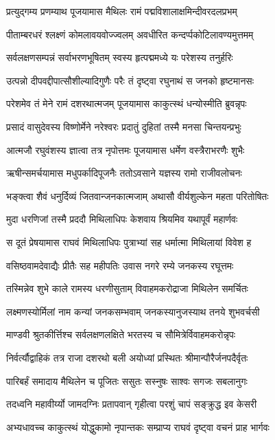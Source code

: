 \twolineshloka
{प्रत्युद्गम्य प्रणम्याथ पूजयामास मैथिलः}
{रामं पद्मविशालाक्षमिन्दीवरदलप्रभम्}%

\twolineshloka
{पीताम्बरधरं श्लक्ष्णं कोमलावयवोज्ज्वलम्}
{अवधीरित कन्दर्प्पकोटिलावण्यमुत्तमम्}%

\twolineshloka
{सर्वलक्षणसम्पन्नं सर्वाभरणभूषितम्}
{स्वस्य हृत्पद्ममध्ये यः परेशस्य तनुर्हरिः}%

\twolineshloka
{उत्पन्नो दीपवद्दीपात्सौशील्यादिगुणैः परैः}
{तं दृष्ट्वा रघुनाथं स जनको हृष्टमानसः}%

\twolineshloka
{परेशमेव तं मेने रामं दशरथात्मजम्}
{पूजयामास काकुत्स्थं धन्योस्मीति ब्रुवन्नृपः}%

\twolineshloka
{प्रसादं वासुदेवस्य विष्णोर्मेने नरेश्वरः}
{प्रदातुं दुहितां तस्मै मनसा चिन्तयन्प्रभुः}%

\twolineshloka
{आत्मजौ रघुवंशस्य ज्ञात्वा तत्र नृपोत्तमः}
{पूजयामास धर्मेण वस्त्रैराभरणैः शुभैः}%

\twolineshloka
{ऋषीन्समर्चयामास मधुपर्कादिपूजनैः}
{ततोऽवसाने यज्ञस्य रामो राजीवलोचनः}%

\twolineshloka
{भङ्क्त्वा शैवं धनुर्दिव्यं जितवान्जनकात्मजाम्}
{अथासौ वीर्यशुल्केन महता परितोषितः}%

\twolineshloka
{मुदा धरणिजां तस्मै प्रददौ मिथिलाधिपः}
{केशवाय श्रियमिव यथापूर्वं महार्णवः}%

\twolineshloka
{स दूतं प्रेषयामास राघवं मिथिलाधिपः}
{पुत्राभ्यां सह धर्मात्मा मिथिलायां विवेश ह}%

\twolineshloka
{वसिष्ठवामदेवाद्यैः प्रीतैः सह महीपतिः}
{उवास नगरे रम्ये जनकस्य रघूत्तमः}%

\twolineshloka
{तस्मिन्नेव शुभे काले रामस्य धरणीसुताम्}
{विवाहमकरोद्राजा मिथिलेन समर्चितः}%

\twolineshloka
{लक्ष्मणस्योर्मिलां नाम कन्यां जनकसम्भवाम्}
{जनकस्यानुजस्याथ तनये शुभवर्चसी}%

\twolineshloka
{माण्डवी श्रुतकीर्त्तिश्च सर्वलक्षणलक्षिते}
{भरतस्य च सौमित्रेर्विवाहमकरोन्नृपः}%

\twolineshloka
{निर्वर्त्यौद्वाहिकं तत्र राजा दशरथो बली}
{अयोध्यां प्रस्थितः श्रीमान्पौरैर्जनपदैर्वृतः}%

\twolineshloka
{पारिबर्हं समादाय मैथिलेन च पूजितः}
{ससुतः सस्नुषः साश्वः सगजः सबलानुगः}%

\twolineshloka
{तदध्वनि महावीर्य्यो जामदग्निः प्रतापवान्}
{गृहीत्वा परशुं चापं सङ्क्रुद्ध इव केसरी}%

\twolineshloka
{अभ्यधावच्च काकुत्स्थं योद्धुकामो नृपान्तकः}
{सम्प्राप्य राघवं दृष्ट्वा वचनं प्राह भार्गवः}%

